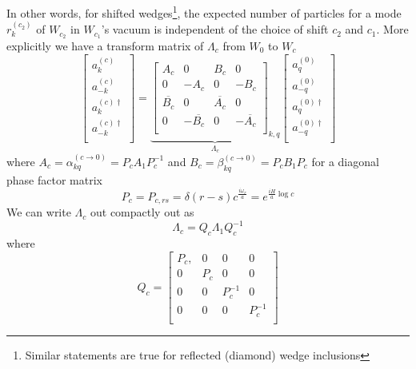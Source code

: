 \documentclass[12pt,a4paper]{article}
\begin{document}
In other words, for shifted wedges\footnote{Similar statements are true for reflected (diamond) wedge inclusions}, the expected number of particles for a mode $r^{(c_2)}_k$ of $W_{c_2}$ in $W_{c_1}$'s vacuum is independent of the choice of shift $c_2$ and $c_1$. More explicitly we have a transform matrix of $\Lambda_c$ from $W_0$ to $W_c$ 
\begin{equation}
  \left[ \begin{array}{l}
    a^{(c)}_k \\
    a^{(c)}_{-k} \\
    \hline
    a^{(c)\dagger}_k \\
    a^{(c)\dagger}_{-k} \\
 \end{array} \right] = \underbrace{
  \left[
\begin{array}{rr|rr}
    A_c        &       0   &  B_c            &  0 \\
    0        &      -A_c   &  0            & -B_c \\
    \hline
    \overline{B_c}        &    0      &  \overline{A_c} & 0 \\
    0 &    -\overline{B_c}      &   0           & -\overline{A_c} \\
\end{array} \right]_{k,q} }_{\Lambda_c}
  \left[ \begin{array}{l}
    a^{(0)}_q \\
    a^{(0)}_{-q} \\
    \hline
    a^{(0)\dagger}_q \\
    a^{(0)\dagger}_{-q} \\
 \end{array} \right]
\end{equation}
where $A_c = \alpha_{kq}^{(c \rightarrow 0)} = P_c A_1 P_c^{-1}$  and $B_c = \beta_{kq}^{(c \rightarrow 0)} = P_c B_1 P_c$ for a diagonal phase factor matrix
\begin{equation}
  P_c = P_{c,rs} = \delta(r - s) c^{\frac{i\omega_r}{a}} = e^{\frac{i H}{a} \log c}
\end{equation}
We can write $\Lambda_c$ out compactly out as
\begin{equation}
  \Lambda_c = Q_c \Lambda_1 Q_c^{-1}
\end{equation}
where
\begin{equation}
  Q_c = \left[\begin{array}{cccc}
        P_c, & 0 & 0 & 0 \\
        0 & P_c & 0 & 0 \\
        0 & 0 & P_c^{-1} & 0 \\
        0 & 0 & 0 & P_c^{-1} \\
    \end{array} \right] 
\end{equation}
\end{document}

